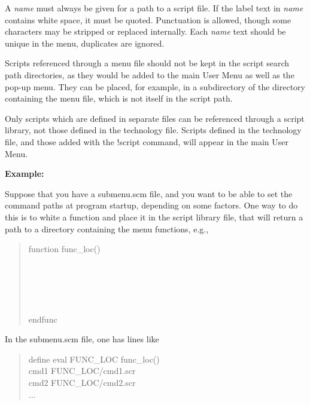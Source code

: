 A {\it name} must always be given for a path to a script file.  If the
label text in {\it name} contains white space, it must be quoted. 
Punctuation is allowed, though some characters may be stripped or
replaced internally.  Each {\it name} text should be unique in the
menu, duplicates are ignored.

Scripts referenced through a menu file should not be kept in the
script search path directories, as they would be added to the main
{\cb User Menu} as well as the pop-up menu.  They can be placed, for
example, in a subdirectory of the directory containing the menu file,
which is not itself in the script path.

Only scripts which are defined in separate files can be referenced
through a script library, not those defined in the technology file. 
Scripts defined in the technology file, and those added with the {\cb
!script} command, will appear in the main {\cb User Menu}.

{\bf Example:}

Suppose that you have a {\vt submenu.scm} file, and you want to be
able to set the command paths at program startup, depending on some
factors.  One way to do this is to white a function and place it in
the script {\vt library} file, that will return a path to a
directory containing the menu functions, e.g.,

\begin{quote}
{\vt function func\_loc()}\\
\\
\hspace*{4ex}{\vt return ("/home/bob/commands")}\\
\hspace*{2ex}{\vt else}\\
\hspace*{4ex}{\vt return ("/home/joe/commands")}\\
\hspace*{2ex}{\vt end}\\
{\vt endfunc}
\end{quote}

In the {\vt submenu.scm} file, one has lines like

\begin{quote} \vt
define eval FUNC\_LOC func\_loc()\\
cmd1 FUNC\_LOC/cmd1.scr\\
cmd2 FUNC\_LOC/cmd2.scr\\
...
\end{quote}

